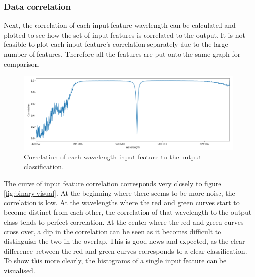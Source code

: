 \documentclass{article}
\begin{document}
\subsubsection{Data correlation}
Next, the correlation of each input feature wavelength can be calculated and plotted to see how the set of input features is correlated to the output. It is not feasible to plot each input feature's correlation separately due to the large number of features. Therefore all the features are put onto the same graph for comparison.
\begin{figure}[H]
\centering
\includegraphics[width=1\textwidth, keepaspectratio]{imgs/binary-correlation.png}
\caption{Correlation of each wavelength input feature to the output classification.}
\label{fig:binary-correlation}
\end{figure}
\noindent
The curve of input feature correlation corresponds very closely to figure \ref{fig:binary-visual}. At the beginning where there seems to be more noise, the correlation is low. At the wavelengths where the red and green curves start to become distinct from each other, the correlation of that wavelength to the output class tends to perfect correlation. At the center where the red and green curves cross over, a dip in the correlation can be seen as it becomes difficult to distinguish the two in the overlap. This is good news and expected, as the clear difference between the red and green curves corresponds to a clear classification. 
\n
To show this more clearly, the histograms of a single input feature can be visualised.
\end{document}
